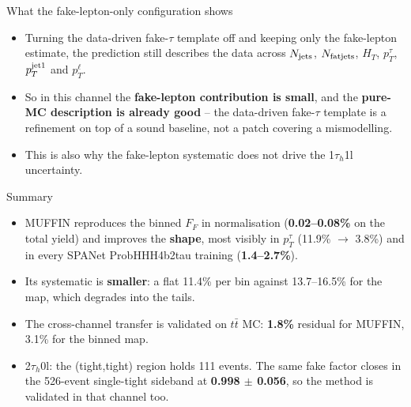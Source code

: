 \documentclass[aspectratio=169,10pt]{beamer}
\begin{document}


\begin{frame}{What the fake-lepton-only configuration shows}
  \small
  \begin{itemize}
    \item Turning the data-driven fake-$\tau$ template off and keeping only the
      fake-lepton estimate, the prediction still describes the data across
      $N_{\rm jets}$, $N_{\rm fatjets}$, $H_T$, $p_T^{\tau}$, $p_T^{\rm jet1}$
      and $p_T^{\ell}$.
    \item So in this channel the \textbf{fake-lepton contribution is small}, and
      the \textbf{pure-MC description is already good} -- the data-driven
      fake-$\tau$ template is a refinement on top of a sound baseline, not a
      patch covering a mismodelling.
    \item This is also why the fake-lepton systematic does not drive the
      1$\tau_h$1l uncertainty.
  \end{itemize}
\end{frame}

\begin{frame}{Summary}
  \small
  \begin{itemize}
    \item MUFFIN reproduces the binned $F_F$ in normalisation
      (\textbf{0.02--0.08\%} on the total yield) and improves the \textbf{shape},
      most visibly in $p_T^{\tau}$ (11.9\% $\to$ 3.8\%) and in every SPANet
      ProbHHH4b2tau training (\textbf{1.4--2.7\%}).
    \item Its systematic is \textbf{smaller}: a flat 11.4\% per bin against
      13.7--16.5\% for the map, which degrades into the tails.
    \item The cross-channel transfer is validated on $t\bar t$ MC:
      \textbf{1.8\%} residual for MUFFIN, 3.1\% for the binned map.
    \item 2$\tau_h$0l: the (tight,tight) region holds 111 events. The same fake
      factor closes in the 526-event single-tight sideband at
      \textbf{0.998 $\pm$ 0.056}, so the method is validated in that channel too.
  \end{itemize}
\end{frame}
\end{document}
